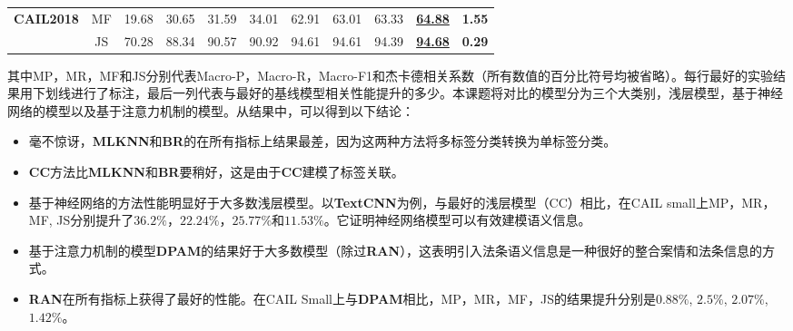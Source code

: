 \begin{table}[htbp]
\begin{tabular}{@{}c|c|cccc|cc|c|c|c@{}}
        \textbf{CAIL2018}                 & MF                               & 19.68                    & 30.65                    & 31.59                   & 34.01                   & 62.91                                                     & 63.01                                                    & 63.33                                                                                      & \underline{\textbf{64.88}}                                                               & \textbf{1.55}                     \\
                                          & JS                                & 70.28                    & 88.34                    & 90.57                   & 90.92                   & 94.61                                                     & 94.61                                                    & 94.39                                                                                      & \underline{\textbf{94.68}}                                                                & \textbf{0.29}                     \\ \bottomrule
        \end{tabular}
\end{table}

其中MP，MR，MF和JS分别代表Macro-P，Macro-R，Macro-F1和杰卡德相关系数（所有数值的百分比符号均被省略）。每行最好的实验结果用下划线进行了标注，最后一列代表与最好的基线模型相关性能提升的多少。本课题将对比的模型分为三个大类别，浅层模型，基于神经网络的模型以及基于注意力机制的模型。从结果中，可以得到以下结论：
\begin{itemize}
    \item 毫不惊讶，\textbf{MLKNN}和\textbf{BR}的在所有指标上结果最差，因为这两种方法将多标签分类转换为单标签分类。
    \item \textbf{CC}方法比\textbf{MLKNN}和\textbf{BR}要稍好，这是由于\textbf{CC}建模了标签关联。
    \item 基于神经网络的方法性能明显好于大多数浅层模型。以\textbf{TextCNN}为例，与最好的浅层模型（CC）相比，在CAIL small上MP，MR，MF, JS分别提升了$36.2\%$，$22.24\%$，$25.77\%$和$11.53\%$。它证明神经网络模型可以有效建模语义信息。
    \item 基于注意力机制的模型\textbf{DPAM}的结果好于大多数模型（除过\textbf{RAN}），这表明引入法条语义信息是一种很好的整合案情和法条信息的方式。
    \item \textbf{RAN}在所有指标上获得了最好的性能。在CAIL Small上与\textbf{DPAM}相比，MP，MR，MF，JS的结果提升分别是$0.88\%$, $2.5\%$, $2.07\%$, $1.42\%$。
\end{itemize}

